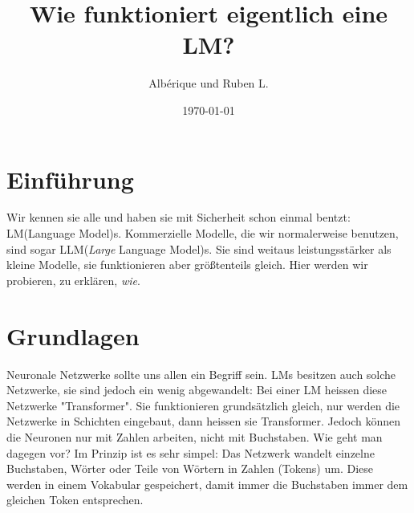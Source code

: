 \documentclass[12pt, letterpaper]{article}
\title{Wie funktioniert eigentlich eine LM?}
\author{Albérique und Ruben L.}
\date{\today}
\begin{document}
\maketitle
\newpage
\section{Einführung}
Wir kennen sie alle und haben sie mit Sicherheit schon einmal bentzt: LM(Language Model)s. Kommerzielle Modelle, die wir normalerweise benutzen, sind sogar LLM(\textit{Large} Language Model)s. Sie sind weitaus leistungsstärker als kleine Modelle, sie funktionieren aber größtenteils gleich. Hier werden wir probieren, zu erklären, \textit{wie}.
\section{Grundlagen}
Neuronale Netzwerke sollte uns allen ein Begriff sein. LMs besitzen auch solche Netzwerke, sie sind jedoch ein wenig abgewandelt: Bei einer LM heissen diese Netzwerke "Transformer". Sie funktionieren grundsätzlich gleich, nur werden die Netzwerke in Schichten eingebaut, dann heissen sie Transformer. Jedoch können die Neuronen nur mit Zahlen arbeiten, nicht mit Buchstaben. Wie geht man dagegen vor? Im Prinzip ist es sehr simpel: Das Netzwerk wandelt einzelne Buchstaben, Wörter oder Teile von Wörtern in Zahlen (Tokens) um. Diese werden in einem Vokabular gespeichert, damit immer die Buchstaben immer dem gleichen Token entsprechen. 
\end{document}
